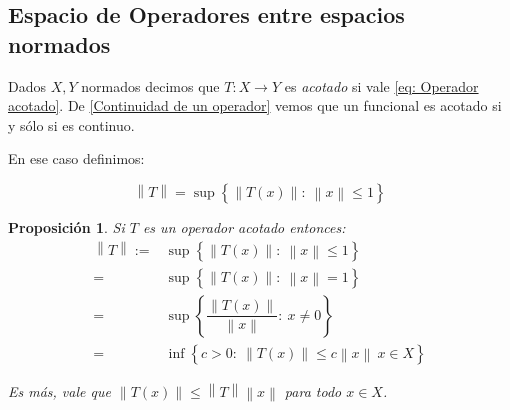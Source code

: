 \documentclass[11pt]{article}
\newcommand{\norm}[1]{\left\lVert#1\right\rVert}
\newcommand{\sett}[1]{\left\lbrace#1\right\rbrace}
\numberwithin{theorem}{subsection}
\newtheorem{proposition}[theorem]{Proposici\'on}
\newenvironment{definition}[1][Definici\'on]{\begin{trivlist}
		\item[\hskip \labelsep {\bfseries #1}]}{\end{trivlist}}
\begin{document}
\subsection{Espacio de Operadores entre espacios normados}

\begin{definition}
	Dados $X,Y$ normados decimos que $T : X \rightarrow Y$ es \textit{acotado} si vale \ref{eq: Operador acotado}. De \ref{Continuidad de un operador} vemos que un funcional es acotado si y s\'olo si es continuo.
	
	En ese caso definimos:
	
	\begin{equation*}
	\norm{T} = \sup \sett{\norm{T(x)}: \ \norm{x} \leq 1}
	\end{equation*}
	
\end{definition}

\begin{proposition}
	\label{Normas equivalentes de un operador}
	Si $T$ es un operador acotado entonces:
	\begin{equation}
	\label{eq: Normas equivalentes de un operador}
	\begin{aligned}
	\norm{T} := & \sup \sett{\norm{T(x)}: \ \norm{x} \leq 1} \\
	= & \sup \sett{\norm{T(x)}: \ \norm{x} = 1}\\
	= & \sup \sett{\dfrac{\norm{T(x)}}{\norm{x}}: \ x \neq 0}  \\
	= & \inf \sett{c > 0: \ \norm{T(x)} \leq c \norm{x} \ x \in X} 
	\end{aligned}	
	\end{equation}
	
	Es m\'as, vale que $\norm{T(x)} \leq \norm{T} \norm{x}$ para todo $x \in X$.
	
\end{proposition}
\end{document}
